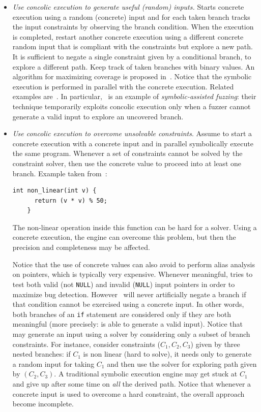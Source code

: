 \begin{itemize}
  \item {\em Use concolic execution to generate useful (random) inputs.} Starts concrete execution using a random (concrete) input and for each taken branch tracks the input constraints by observing the branch condition. When the execution is completed, restart another concrete execution using a different concrete random input that is compliant with the constraints but explore a new path. It is sufficient to negate a single constraint given by a conditional branch, to explore a different path. Keep track of taken branches with binary values. An algorithm for maximizing coverage is proposed in~\cite{DART-PLDI05}. Notice that the symbolic execution is performed in parallel with the concrete execution. Related examples are~\cite{SAGE-NDSS08,DRILLER-NDSS16}. In particular,~\cite{DRILLER-NDSS16} is an example of {\em symbolic-assisted fuzzing}: their technique temporarily exploits concolic execution only when a fuzzer cannot generate a valid input to explore an uncovered branch.

  \item {\em Use concolic execution to overcome unsolvable constraints}. Assume to start a concrete execution with a concrete input and in parallel symbolically execute the same program. Whenever a set of constraints cannot be solved by the constraint solver, then use the concrete value to proceed into at least one branch. Example taken from~\cite{CS-CACM13}:
    \begin{lstlisting}[basicstyle=\ttfamily\small]
    int non_linear(int v) {
      return (v * v) % 50;
    }
    \end{lstlisting}
  The non-linear operation inside this function can be hard for a solver. Using a concrete execution, the engine can overcome this problem, but then the precision and completeness may be affected.

  Notice that the use of concrete values can also avoid to perform alias analysis on pointers, which is typically very expensive. Whenever meaningful, \cite{DART-PLDI05} tries to test both valid (not {\tt NULL}) and invalid ({\tt NULL}) input pointers in order to maximize bug detection. However~\cite{DART-PLDI05} will never artificially negate a branch if that condition cannot be exercised using a concrete input. In other words, both branches of an {\tt if} statement are considered only if they are both meaningful (more precisely: \cite{DART-PLDI05} is able to generate a valid input). Notice that~\cite{DART-PLDI05} may generate an input using a solver by considering only a subset of branch constraints. For instance, consider constraints ($C_1, C_2, C_3$) given by three nested branches: if $C_1$ is non linear (hard to solve), it needs only to generate a random input for taking $C_1$ and then use the solver for exploring path given by $(C_2, C_3)$. A traditional symbolic execution engine may get stuck at $C_1$ and give up after some time on {\em all} the derived path. Notice that whenever a concrete input is used to overcome a hard constraint, the overall approach become incomplete.

\end{itemize} 

